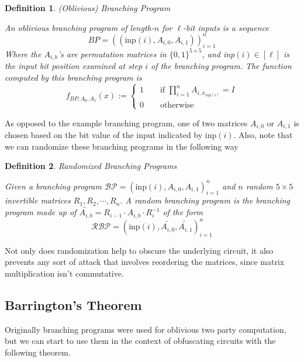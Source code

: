 \documentclass[12pt,twoside]{reedthesis}
\newtheorem{definition}{Definition}
\begin{document}
    
    \begin{definition}{(Oblivious) Branching Program}
    \par  An oblivious branching program of length-$n$ for $\ell$-bit inputs is a sequence
    $$BP = ((\text{inp}(i),A_{i,0},A_{i,1}))_{i=1}^n $$
    Where the $A_{i,b}$'s are permutation matrices in $\{0,1\}^{5 \times 5}$, and inp$(i)\in [\ell]$ is the input bit position examined at step $i$ of the branching program. The function computed by this branching program is
    $$f_{BP,A_0,A_1}(x):= \begin{cases}
    1 \quad \quad \text{if } \prod_{i=1}^n A_{i,x_{inp(i)}} = I \\
    0 \quad \quad \text{otherwise} 
    \end{cases}$$
    \end{definition}
    
     \par As opposed to the example branching program, one of two matrices $A_{i,0}$ or $A_{i,1}$ is chosen based on the bit value of the input indicated by inp$(i)$. Also, note that we can randomize these branching programs in the following way
    
    \begin{definition}{Randomized Branching Programs}
      \newcommand{\inp}[0]{\text{inp}}
     \par Given a branching program $\mathcal{BP} = (\inp(i),A_{i,0},A_{i,1})_{i=1}^n$ and $n$ random $5 \times 5$ invertible matrices $R_1,R_2,\cdots, R_n$. A random branching program is the branching program made up of $\tilde{A_{i,b}} = R_{i-1}\cdot A_{i,b}\cdot R_i^{-1}$ of the form 
      $$\mathcal{RBP} = (\inp(i),\tilde{A_{i,0}},\tilde{A_{i,1}})_{i=1}^n$$
     \end{definition}

\par Not only does randomization help to obscure the underlying circuit, it also prevents any sort of attack that involves reordering the matrices, since matrix multiplication isn't commutative.
      
       
            
      \subsection{Barrington's Theorem}
      
       Originally branching programs were used for oblivious two party computation, but we can start to use them in the context of obfuscating circuits with the following theorem.
      
\end{document}
